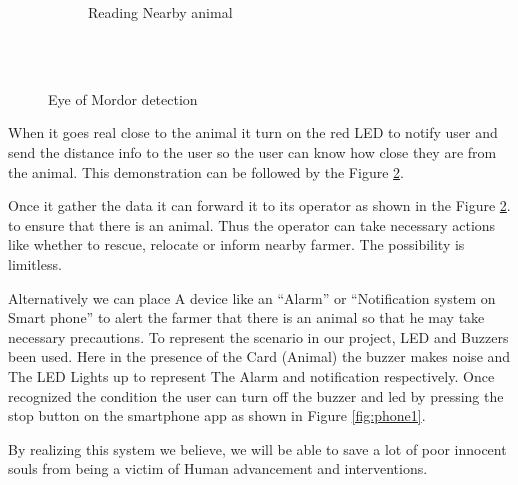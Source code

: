 \documentclass[12pt]{article}
\begin{document}
\begin{figure}[!h]
\begin{subfigure}{.5\textwidth}
  \caption{Reading Nearby animal}
  \label{fig:sub3}
\end{subfigure} \\ \\
\caption{Eye of Mordor detection}
\label{fig:eye23}
\end{figure}

When it goes real close to the animal it turn on the red LED to notify user and send the distance info to the user so the user can know how close they are from the animal. This demonstration can be followed by the Figure \ref{fig:eye23}.

Once it gather the data it can forward it to its operator as shown in the Figure \ref{fig:eye23}. to ensure that there is an animal. Thus the operator can take necessary actions like whether to rescue, relocate or inform nearby farmer. The possibility is limitless.

Alternatively we can place A device like an “Alarm” or “Notification system on Smart phone” to alert the farmer that there is an animal so that he may take necessary precautions. To represent the scenario in our project, LED and Buzzers been used. Here in the presence of the Card (Animal) the buzzer makes noise and The LED Lights up to represent The Alarm and notification respectively. Once recognized the condition the user can turn off the buzzer and led by pressing the stop button on the smartphone app as shown in Figure \ref{fig:phone1}.

By realizing this system we believe, we will be able to save a lot of poor innocent souls from being a victim of Human advancement and interventions.
\end{document}
